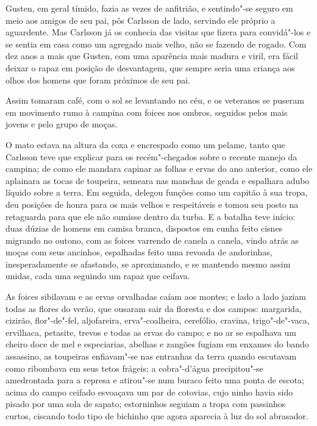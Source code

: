 Gusten, em geral tímido, fazia as vezes de anfitrião, e sentindo"-se
seguro em meio aos amigos de seu pai, pôs Carlsson de lado, servindo ele próprio
a aguardente. Mas Carlsson já os conhecia das visitas que fizera para
convidá"-los e se sentia em casa como um agregado mais velho, não se fazendo de
rogado. Com dez anos a mais que Gusten, com uma aparência mais madura e viril,
era fácil deixar o rapaz em posição de desvantagem, que sempre seria uma criança
aos olhos dos homens que foram próximos de seu pai.

Assim tomaram café, com o sol se levantando no céu, e os veteranos se puseram em
movimento rumo à campina com foices nos ombros, seguidos pelos mais jovens e
pelo grupo de moças.

O mato estava na altura da coxa e encrespado como um pelame, tanto que Carlsson
teve que explicar para os recém"-chegados sobre o recente manejo da campina; de
como ele mandara capinar as folhas e ervas do ano anterior, como ele aplainara
as tocas de toupeira, semeara nas manchas de geada e espalhara adubo líquido
sobre a terra. Em seguida, delegou funções como um capitão à sua tropa, deu
posições de honra para os mais velhos e respeitáveis e tomou seu posto na
retaguarda para que ele não sumisse dentro da turba. E a batalha teve início: duas
dúzias de homens em camisa branca, dispostos em cunha feito cisnes migrando no
outono, com as foices varrendo de canela a canela, vindo atrás as moças com seus
ancinhos, espalhadas feito uma revoada de andorinhas, inesperadamente se
afastando, se aproximando, e se mantendo mesmo assim unidas, cada uma seguindo
um rapaz que ceifava.\EP[-1]

As foices sibilavam e as ervas orvalhadas caíam aos montes; e lado a lado jaziam
todas as flores do verão, que ousaram sair da floresta e dos campos: margarida,
cizirão, flor"-de"-fel, aljofareira, erva"-coalheira, cerefólio, cravina,
trigo"-de"-vaca, ervilhaca, petasite, trevos e todas as ervas do campo; e no ar se
espalhava um cheiro doce de mel e especiarias, abelhas e zangões fugiam em
enxames do bando assassino, as toupeiras enfiavam"-se nas entranhas da terra
quando escutavam como ribombava em seus tetos frágeis; a cobra"-d’água 
precipitou"-se amedrontada para a represa e atirou"-se num buraco feito uma
ponta de escota; acima do campo ceifado esvoaçava um par de cotovias,
cujo ninho havia sido pisado por uma sola de sapato; estorninhos seguiam a
tropa com passinhos curtos, ciscando todo tipo de bichinho que agora aparecia à
luz do sol abrasador.

